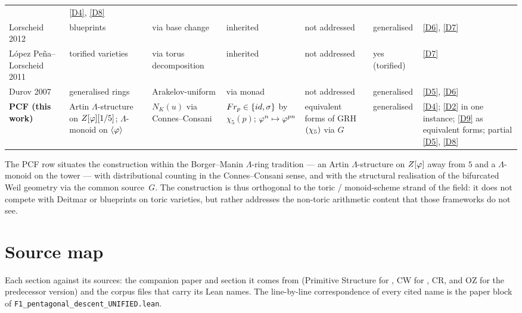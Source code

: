 \begin{center}
\begin{tabular}{@{}p{2.5cm}p{2cm}p{2cm}p{1.8cm}p{2cm}p{1.5cm}p{2cm}@{}}
  & \ref{D4}, \ref{D8} \\
Lorscheid 2012~\cite{lorscheid12blueprints}
  & blueprints
  & via base change
  & inherited
  & not addressed
  & \hspace{0pt}generalised
  & \ref{D6}, \ref{D7} \\
L\'opez Pe\~na--Lorscheid 2011~\cite{lopezpena09torified}
  & torified varieties
  & via torus decomposition
  & inherited
  & not addressed
  & yes (torified)
  & \ref{D7} \\
Durov 2007~\cite{durov07}
  & \hspace{0pt}generalised rings
  & Arakelov-uniform
  & via monad
  & not addressed
  & \hspace{0pt}generalised
  & \ref{D5}, \ref{D6} \\
\midrule
\textbf{PCF (this work)}
  & Artin $\Lambda$-structure on $Z[\varphi][1/5]$; $\Lambda$-monoid on $\langle\varphi\rangle$
  & $N_K(u)$ via Connes--Consani
  & $Fr_p\in\{id,\sigma\}$ by $\chi_5(p)$; $\varphi^n\mapsto\varphi^{pn}$
  & equivalent forms of GRH$(\chi_5)$ via $G$
  & \hspace{0pt}generalised
  & \ref{D4}; \ref{D2} in one instance; \ref{D9} as equivalent forms; partial \ref{D5}, \ref{D8} \\
\bottomrule
\end{tabular}
\end{center}

The PCF row situates the construction within the Borger--Manin
$\Lambda$-ring tradition --- an Artin $\Lambda$-structure on $Z[\varphi]$ away from $5$ and a
$\Lambda$-monoid on the tower ---
with distributional counting in the
Connes--Consani sense, and with the structural realisation of
the bifurcated Weil geometry via the common source~$G$.  The
construction is thus orthogonal to the toric / monoid-scheme
strand of the field: it does not compete with Deitmar or
blueprints on toric varieties, but rather addresses the
non-toric arithmetic content that those frameworks do not see.




\section{Source map}\label{app:sources}
Each section against its sources: the companion paper and section it comes from
(Primitive Structure for \cite{gonzalez25hp}, CW for \cite{gonzalez26cw}, CR, and OZ for the predecessor version) and the corpus files that carry its Lean
names.  The line-by-line correspondence of every cited name is the paper block of
\texttt{F1\_pentagonal\_descent\_UNIFIED.lean}.

